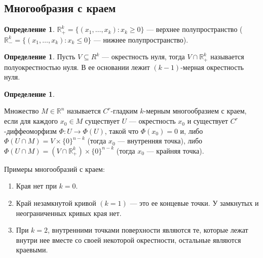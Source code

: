 \documentclass[a5paper]{article}
\newcounter{through}
\theoremstyle{plain}
\theoremstyle{definition}
\newtheorem{definition}[through]{Определение}
\numberwithin{through}{section}
\numberwithin{equation}{section}
\begin{document}
\subsection{Многообразия с краем}

\begin{definition}
	$\mathbb{R}_+^k = \{(x_1, \ldots, x_k) : x_k \ge 0\}$ --- верхнее полупространство ($\mathbb{R}_-^k = \{(x_1, \ldots, x_k) : x_k \le 0\}$ --- нижнее полупространство).
\end{definition}

\begin{definition}
	Пусть $V \subseteq R^k$ --- окрестность нуля, тогда $V \cap \mathbb{R}_+^k$ называется полуокрестностью нуля. В ее основании лежит $(k-1)$-мерная окрестность нуля.
\end{definition}

\begin{definition}
	\label{ManifoldWithBoundary}
	
	Множество $M \in \mathbb{R}^n$ называется $C^r$-гладким $k$-мер\-ным
	многообразием с краем, если для каждого $x_0 \in M$ существует $U$ --- окрестность $x_0$ и существует $ C^r$-диффеоморфизм $\Phi : U \to \Phi (U)$, такой что $\Phi(x_0)=0$ и, либо $\Phi(U \cap M) = V \times \{0\}^{n-k}$ (тогда $x_0$ --- внутренняя точка), либо
	$\Phi(U \cap M) = (V \cap \mathbb{R}_+^k ) \times \{0\}^{n-k}$ (тогда 
	$x_0$ --- крайняя точка).
	
\end{definition}


Примеры многообразий с краем:

\begin{enumerate}	
	\item
	Края нет при $k = 0$.
	
	\item
	Край незамкнутой кривой $(k = 1)$ --- это ее концевые точки. У замкнутых и неограниченных кривых края нет.
	\begin{center}
	\end{center}
	\item
	При $k = 2$, внутренними точками поверхности являются те, которые лежат внутри нее вместе со своей некоторой окрестности, остальные являются краевыми.
	
	
	
\end{enumerate}
\end{document}
